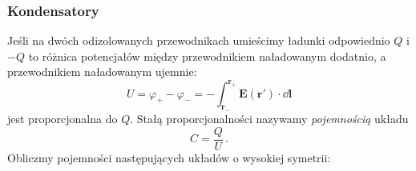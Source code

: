 \documentclass[../main.tex]{subfiles}
\begin{document}
\subsubsection{Kondensatory}
Jeśli na dwóch odizolowanych przewodnikach umieścimy ładunki odpowiednio \(Q\) i \(-Q\) to różnica
potencjałów między przewodnikiem naładowanym dodatnio, a przewodnikiem naładowanym ujemnie:
\begin{equation*}
    U=\varphi_+-\varphi_-=-\int_{\mathbf{r}_-}^{\mathbf{r}_+}\mathbf{E}(\mathbf{r}')\cdot\dd{\mathbf{l}}
\end{equation*}
jest proporcjonalna do \(Q\). Stałą proporcjonalności nazywamy \textit{pojemnością} układu
\begin{equation*}
    C=\frac{Q}{U}\,.
\end{equation*}
Obliczmy pojemności następujących układów o wysokiej symetrii:
\end{document}
